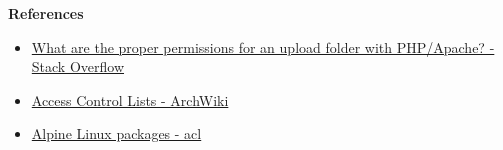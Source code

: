 \documentclass[12pt, a4paper]{article}
\begin{document}
\begin{enumerate}[label=(\alph*)]
    \textbf{References}
    \begin{itemize}
      \item \href{https://stackoverflow.com/questions/10990/what-are-the-proper-permissions-for-an-upload-folder-with-php-apache}{What are the proper permissions for an upload folder with PHP/Apache? - Stack Overflow}
      \item \href{https://wiki.archlinux.org/title/Access_Control_Lists}{Access Control Lists - ArchWiki}
      \item \href{https://pkgs.alpinelinux.org/package/edge/main/x86_64/acl}{Alpine Linux packages - acl}
    \end{itemize}
  \end{enumerate}
\end{document}
